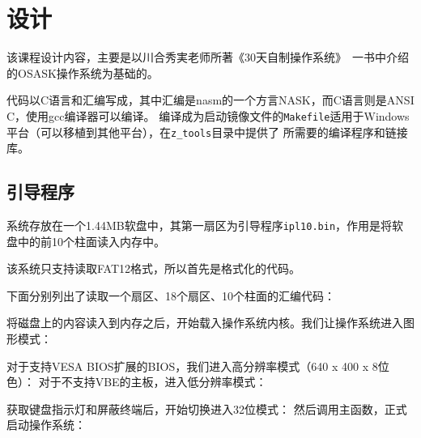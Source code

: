 \section{设计}

该课程设计内容，主要是以{\ja 川合秀実}老师所著《30天自制操作系统》\cite{osask}~一书中介绍的OSASK操作系统为基础的。

代码以C语言和汇编写成，其中汇编是nasm的一个方言NASK，而C语言则是ANSI C，使用gcc编译器可以编译。
编译成为启动镜像文件的\verb|Makefile|适用于Windows平台（可以移植到其他平台），在\verb|z_tools|目录中提供了
所需要的编译程序和链接库。

\lstset{basicstyle=\small\tt}

\subsection{引导程序}
\label{sub:引导程序}


系统存放在一个1.44MB软盘中，其第一扇区为引导程序\verb|ipl10.bin|，作用是将软盘中的前10个柱面读入内存中。

该系统只支持读取FAT12格式，所以首先是格式化的代码。
{\linespread{1}}

下面分别列出了读取一个扇区、18个扇区、10个柱面的汇编代码：
{\linespread{1}}
{\linespread{1}}
{\linespread{1}}

将磁盘上的内容读入到内存之后，开始载入操作系统内核。我们让操作系统进入图形模式：
{\linespread{1}}

对于支持VESA BIOS扩展的BIOS，我们进入高分辨率模式（640 x 400 x 8位色）：
{\linespread{1}}
对于不支持VBE的主板，进入低分辨率模式：
{\linespread{1}}

获取键盘指示灯和屏蔽终端后，开始切换进入32位模式：
{\linespread{1}}
然后调用主函数，正式启动操作系统：
{\linespread{1}}

